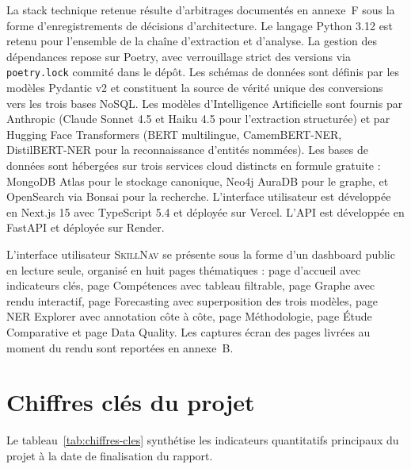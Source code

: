 \documentclass[11pt,a4paper,openany]{report}
\newcommand{\skillnav}{\textsc{SkillNav}\xspace}
\begin{document}
La stack technique retenue r\'esulte d'arbitrages document\'es en annexe~F sous la forme d'enregistrements de d\'ecisions d'architecture. Le langage Python 3.12 est retenu pour l'ensemble de la cha\^ine d'extraction et d'analyse. La gestion des d\'ependances repose sur Poetry, avec verrouillage strict des versions via \texttt{poetry.lock} commit\'e dans le d\'ep\^ot. Les sch\'emas de donn\'ees sont d\'efinis par les mod\`eles Pydantic v2 et constituent la source de v\'erit\'e unique des conversions vers les trois bases NoSQL. Les mod\`eles d'Intelligence Artificielle sont fournis par Anthropic (Claude Sonnet 4.5 et Haiku 4.5 pour l'extraction structur\'ee) et par Hugging Face Transformers (BERT multilingue, CamemBERT-NER, DistilBERT-NER pour la reconnaissance d'entit\'es nomm\'ees). Les bases de donn\'ees sont h\'eberg\'ees sur trois services cloud distincts en formule gratuite : MongoDB Atlas pour le stockage canonique, Neo4j AuraDB pour le graphe, et OpenSearch via Bonsai pour la recherche. L'interface utilisateur est d\'evelopp\'ee en Next.js 15 avec TypeScript 5.4 et d\'eploy\'ee sur Vercel. L'API est d\'evelopp\'ee en FastAPI et d\'eploy\'ee sur Render.

L'interface utilisateur \skillnav se pr\'esente sous la forme d'un dashboard public en lecture seule, organis\'e en huit pages th\'ematiques : page d'accueil avec indicateurs cl\'es, page Comp\'etences avec tableau filtrable, page Graphe avec rendu interactif, page Forecasting avec superposition des trois mod\`eles, page NER Explorer avec annotation c\^ote \`a c\^ote, page M\'ethodologie, page \'Etude Comparative et page Data Quality. Les captures \'ecran des pages livr\'ees au moment du rendu sont report\'ees en annexe~B.

\section{Chiffres cl\'es du projet}

Le tableau~\ref{tab:chiffres-cles} synth\'etise les indicateurs quantitatifs principaux du projet \`a la date de finalisation du rapport.
\end{document}

